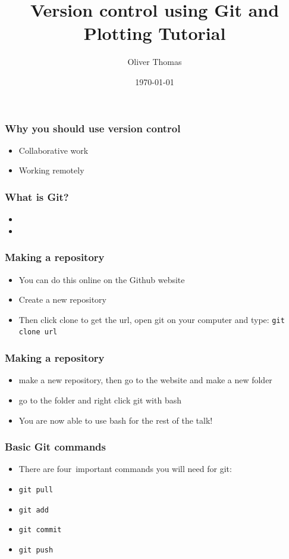 \documentclass{beamer}
\title{Version control using Git and Plotting Tutorial}
\author{Oliver Thomas}
\institute{Quantum Engineering CDT \\ University of Bristol}
\date{\today}
\begin{document}
\frame{\titlepage}

\begin{frame}
\frametitle{Why you should use version control}
\begin{itemize}
\item Collaborative work  
\item Working remotely
\end{itemize}
\end{frame}

\begin{frame}
\frametitle{What is Git?}
\begin{itemize}
\item  
\item
\end{itemize}
\end{frame}

\begin{frame}
\frametitle{Making a repository}
\begin{itemize}
\item You can do this online on the Github website   
\item Create a new repository
\item Then click clone to get the url, open git on your computer and type: 
	\texttt{git clone url}
\end{itemize}
\end{frame}

\begin{frame}
\frametitle{Making a repository}
\begin{itemize}
\item make a new repository, then go to the website and make a new folder 
\item go to the folder and right click git with bash
\item You are now able to use bash for the rest of the talk!
\end{itemize}
\end{frame}


\begin{frame}
\frametitle{Basic Git commands}
\begin{itemize}
	\item There are four\footnotemark\ important commands you will need for git:
	\item \texttt{git pull}
	\item \texttt{git add}
	\item \texttt{git commit}
	\item \texttt{git push}
\end{itemize}
\end{frame}
\end{document}
